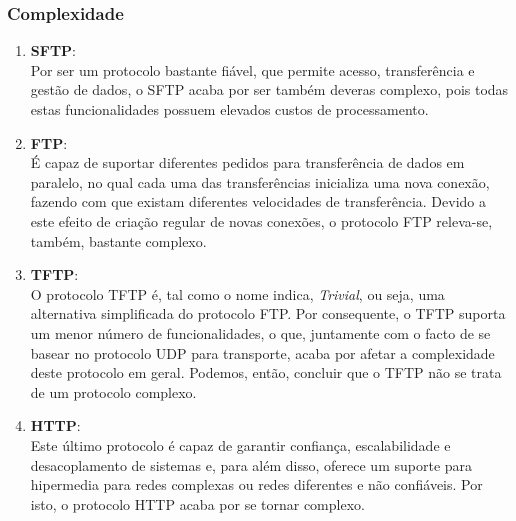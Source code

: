 \documentclass[11pt]{article}
\begin{document}
\subsubsection{Complexidade}
\begin{enumerate}
  \item \textbf{SFTP}:\\
  Por ser um protocolo bastante fiável, que permite acesso, transferência e gestão de dados, o SFTP acaba por ser também deveras complexo, pois todas estas funcionalidades possuem elevados custos de processamento.
  \item \textbf{FTP}:\\
  É capaz de suportar diferentes pedidos para transferência de dados em paralelo, no qual cada uma das transferências inicializa uma nova conexão, fazendo com que existam diferentes velocidades de transferência. Devido a este efeito de criação regular de novas conexões, o protocolo FTP releva-se, também, bastante complexo.
  \item \textbf{TFTP}:\\
  O protocolo TFTP é, tal como o nome indica, \textit{Trivial}, ou seja, uma alternativa simplificada do protocolo FTP. Por consequente, o TFTP suporta um menor número de funcionalidades, o que, juntamente com o facto de se basear no protocolo UDP para transporte, acaba por afetar a complexidade deste protocolo em geral. Podemos, então, concluir que o TFTP não se trata de um protocolo complexo.
  \item \textbf{HTTP}:\\
  Este último protocolo é capaz de garantir confiança, escalabilidade e desacoplamento de sistemas e, para além disso, oferece um suporte para hipermedia para redes complexas ou redes diferentes e não confiáveis. Por isto, o protocolo HTTP acaba por se tornar complexo.
\end{enumerate}
\end{document}
